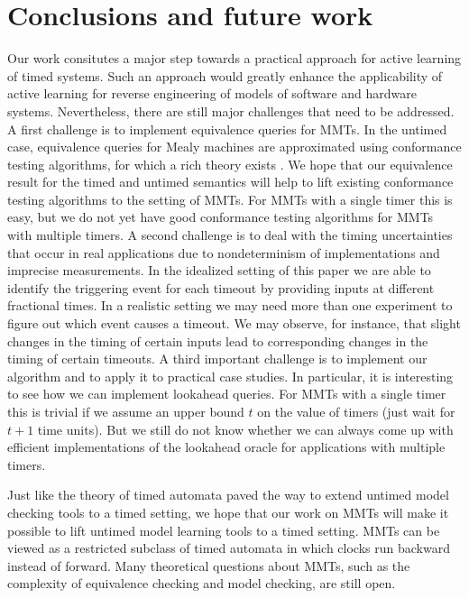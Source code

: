 \ifshort
\vspace{-1em}
\fi
\section{Conclusions and future work}
\label{conclusions}

Our work consitutes a major step towards a practical approach for active learning of timed systems.
Such an approach would greatly enhance the applicability of active learning for reverse engineering of models of
software and hardware systems. Nevertheless, there are still major challenges that need to be addressed.
%
A first challenge is to implement equivalence queries for MMTs.
In the untimed case, equivalence queries for Mealy machines are approximated using conformance testing algorithms,
for which a rich theory exists \cite{LeeY96}.
We hope that our equivalence result for the timed and untimed semantics will help to lift existing conformance
testing algorithms to the setting of MMTs. For MMTs with a single timer this is easy, but we do not yet have good
conformance testing algorithms for MMTs with multiple timers.
%
A second challenge is to deal with the timing uncertainties that occur in real applications due to nondeterminism of
implementations and imprecise measurements. In the idealized setting of this paper we are able to
identify the triggering event for each timeout by providing inputs at different fractional times. In a realistic
setting we may need more than one experiment to figure out which event causes a timeout. We may observe, for instance,
that slight changes in the timing of certain inputs lead to corresponding changes in the timing of certain timeouts.
%
A third important challenge is to implement our algorithm and to apply it to practical case studies. In particular,
it is interesting to see how we can implement lookahead queries. For MMTs with a single timer this is trivial 
if we assume an upper bound $t$ on the value of timers (just  wait for $t+1$ time units).
But we still do not know whether we can always come up with efficient implementations of the lookahead oracle for applications with multiple timers.

\iflong
Just like the theory of timed automata \cite{AD94} paved the way to extend untimed model checking tools to a timed
setting, we hope that our work on MMTs will make it possible to lift untimed model learning tools to a timed setting.
MMTs can be viewed as a restricted subclass of timed automata in which clocks run backward instead of forward.
Many theoretical questions about MMTs, such as the complexity of equivalence checking and model checking, are still open.
\fi
